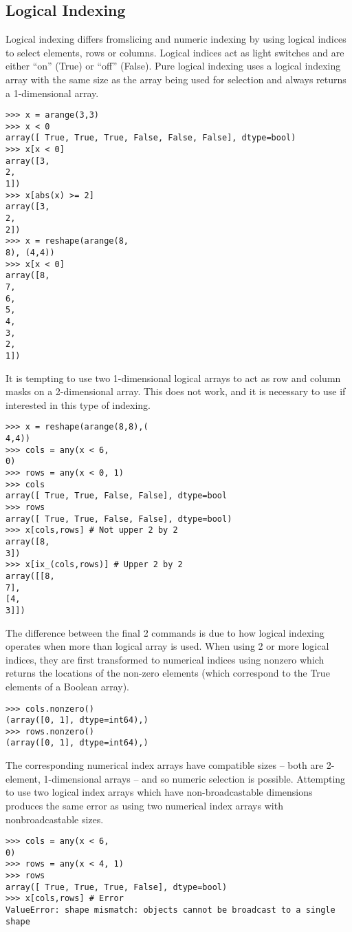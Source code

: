 \documentclass[KSmain.tex]{subfiles}
\begin{document}
\subsection{Logical Indexing}
Logical indexing differs fromslicing and numeric indexing by using logical indices to select elements, rows
or columns. Logical indices act as light switches and are either “on” (True) or “off” (False). Pure logical
indexing uses a logical indexing array with the same size as the array being used for selection and always
returns a 1-dimensional array.
\begin{framed}
\begin{verbatim}
>>> x = arange(3,3)
>>> x < 0
array([ True, True, True, False, False, False], dtype=bool)
>>> x[x < 0]
array([3,
2,
1])
>>> x[abs(x) >= 2]
array([3,
2,
2])
>>> x = reshape(arange(8,
8), (4,4))
>>> x[x < 0]
array([8,
7,
6,
5,
4,
3,
2,
1])
\end{verbatim}
\end{framed}
It is tempting to use two 1-dimensional logical arrays to act as row and column masks on a 2-dimensional
array. This does not work, and it is necessary to use  if interested in this type of indexing.
\begin{framed}
\begin{verbatim}
>>> x = reshape(arange(8,8),(
4,4))
>>> cols = any(x < 6,
0)
>>> rows = any(x < 0, 1)
>>> cols
array([ True, True, False, False], dtype=bool
>>> rows
array([ True, True, False, False], dtype=bool)
>>> x[cols,rows] # Not upper 2 by 2
array([8,
3])
>>> x[ix_(cols,rows)] # Upper 2 by 2
array([[8,
7],
[4,
3]])
\end{verbatim}
\end{framed}
The difference between the final 2 commands is due to how logical indexing operates when more than
logical array is used. When using 2 or more logical indices, they are first transformed to numerical indices
using nonzero which returns the locations of the non-zero elements (which correspond to the True
elements of a Boolean array).
\begin{framed}
\begin{verbatim}
>>> cols.nonzero()
(array([0, 1], dtype=int64),)
>>> rows.nonzero()
(array([0, 1], dtype=int64),)
\end{verbatim}
\end{framed}
The corresponding numerical index arrays have compatible sizes – both are 2-element, 1-dimensional
arrays – and so numeric selection is possible. Attempting to use two logical index arrays which have
non-broadcastable dimensions produces the same error as using two numerical index arrays with nonbroadcastable
sizes.
\begin{framed}
\begin{verbatim}
>>> cols = any(x < 6,
0)
>>> rows = any(x < 4, 1)
>>> rows
array([ True, True, True, False], dtype=bool)
>>> x[cols,rows] # Error
ValueError: shape mismatch: objects cannot be broadcast to a single shape
\end{verbatim}
\end{framed}
\end{document}
